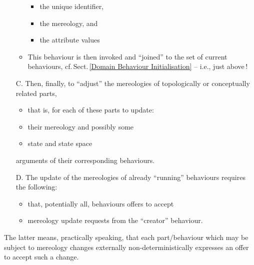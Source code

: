 \begin{itemize}
\begin{itemize}
\begin{itemize}
\item the unique identifier,
\item the mereology, and
\item the attribute values
\end{itemize} 
\item This behaviour is then invoked and ``joined'' to the set of
      current behaviours, cf.\,Sect.\,\vref{Domain Behaviour
      Initialisation} -- i.e., just above\,!
\end{itemize} 
\item[C.] Then, finally, to ``adjust'' the mereologies of
          topologically or conceptually related parts,
\begin{itemize}
\item that is, for  each of these parts to update:
\item their mereology and possibly some
\item state and state space
\end{itemize} arguments of their corresponding behaviours.
\end{itemize}
\mnewfoil

\begin{itemize}
\item[D.] The update of the mereologies \nyl of already ``running'' behaviours
      requires the following:
\begin{itemize}
\item that, potentially all, behaviours offers to accept  
\item mereology update requests from the ``creator'' behaviour.
\end{itemize}
\end{itemize}

\noindent
\begynd
\pind The latter means, practically speaking, 
\begynd
\pind that each part/behaviour 
\pind which may be subject to mereology changes
\pind externally non-deterministically 
\pind expresses an offer to accept such a change.
\afslut
\afslut

